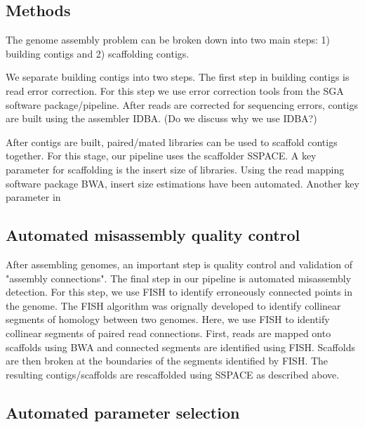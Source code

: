 \documentclass{bioinfo}
\begin{document}
\begin{methods}
\section{Methods}
The genome assembly problem can be broken down into two main steps: 1) building
contigs and 2) scaffolding contigs. 

We separate building contigs into two steps. The first step in building contigs
is read error correction. For this step we use error correction tools from the
SGA software package/pipeline. After reads are corrected for sequencing errors,
contigs are built using the assembler IDBA. (Do we discuss why we use IDBA?)  

After contigs are built, paired/mated libraries can be used to scaffold contigs 
together. For this stage, our pipeline uses the scaffolder SSPACE. A key 
parameter for scaffolding is the insert size of libraries. Using the read
mapping software package BWA, insert size estimations have been automated. Another
key parameter in 


\end{methods}

\subsection{Automated misassembly quality control}

After assembling genomes, an important step is quality control and validation
of "assembly connections". The final step in our pipeline is automated 
misassembly detection. For this step, we use FISH to identify erroneously
connected points in the genome. The FISH algorithm was orignally developed
to identify collinear segments of homology between two genomes. Here, we use
FISH to identify collinear segments of paired read connections. First, reads 
are mapped onto scaffolds using BWA and connected segments are identified using 
FISH. Scaffolds are then broken at the boundaries of the segments identified by
FISH. The resulting contigs/scaffolds are rescaffolded using SSPACE as 
described above.


\subsection{Automated parameter selection}
\end{document}
